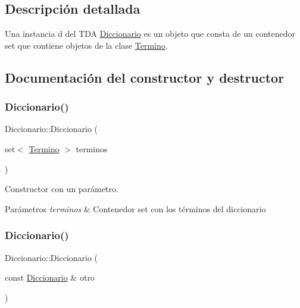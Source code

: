 \subsection{Descripción detallada}
Una instancia d del T\+DA \hyperlink{classDiccionario}{Diccionario} es un objeto que consta de un contenedor set que contiene objetos de la clase \hyperlink{classTermino}{Termino}. 

\subsection{Documentación del constructor y destructor}
\mbox{\label{classDiccionario_a38334390fc9b673fb674f7e712c65657}} 
\subsubsection{\texorpdfstring{Diccionario()}{Diccionario()}\hspace{0.1cm}{\footnotesize\ttfamily [1/2]}}
{\footnotesize\ttfamily Diccionario\+::\+Diccionario (\begin{DoxyParamCaption}\item[{set$<$ \hyperlink{classTermino}{Termino} $>$}]{terminos }\end{DoxyParamCaption})}



Constructor con un parámetro. 


\begin{DoxyParams}{Parámetros}
{\em terminos} & Contenedor set con los términos del diccionario \\
\hline
\end{DoxyParams}
\mbox{\label{classDiccionario_a5f79e840a08666f29b527eb78be167e0}} 
\subsubsection{\texorpdfstring{Diccionario()}{Diccionario()}\hspace{0.1cm}{\footnotesize\ttfamily [2/2]}}
{\footnotesize\ttfamily Diccionario\+::\+Diccionario (\begin{DoxyParamCaption}\item[{const \hyperlink{classDiccionario}{Diccionario} \&}]{otro }\end{DoxyParamCaption})}



